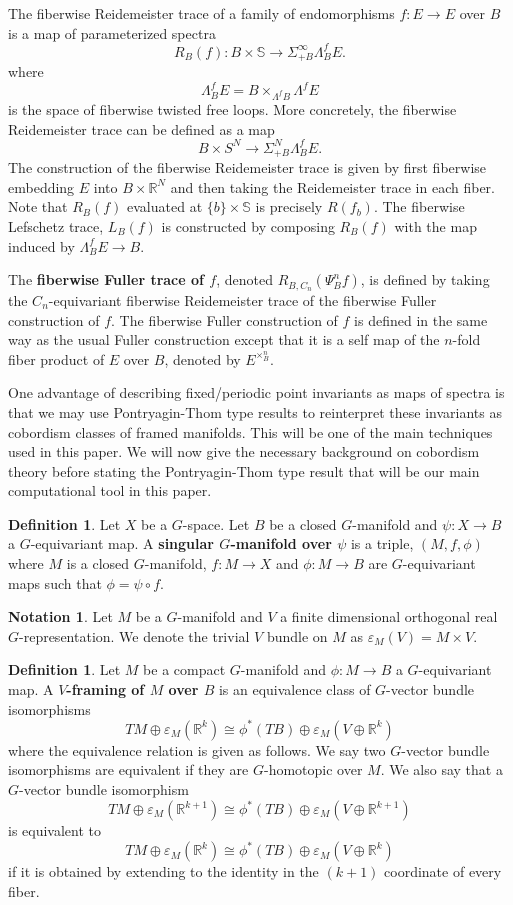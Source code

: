 \documentclass[11pt]{amsart}
\newcommand{\R}{\mathbb R}
\newcommand{\Sph}{\mathbb{S}}
\theoremstyle{plain}   %
\theoremstyle{definition}
\newtheorem{df}[thm]{Definition}
\newtheorem{notn}[thm]{Notation}
\theoremstyle{remark}
\numberwithin{equation}{section}
\begin{document}
The fiberwise Reidemeister trace of a family of endomorphisms $f\colon E\to E$ over $B$ is a map of parameterized spectra
\[
R_B(f)\colon B\times \Sph \rightarrow \Sigma_{+B}^\infty \Lambda_B^f E.
\]
where 
\[
\Lambda_B^f E = B\times_{\Lambda^f B}\Lambda^f E
\]
is the space of fiberwise twisted free loops. More concretely, the fiberwise Reidemeister trace can be defined as a map
\[
B\times S^N \to \Sigma_{+B}^N \Lambda_B^f E. 
\]
The construction of the fiberwise Reidemeister trace is given by first fiberwise embedding $E$ into $B\times \R^N$ and then taking the Reidemeister trace in each fiber. Note that $R_B(f)$ evaluated at $\{b\}\times \Sph$ is precisely $R(f_b)$. The fiberwise Lefschetz trace, $L_B(f)$ is constructed by composing $R_B(f)$ with the map induced by $\Lambda_B^f E \to B$. 


The \textbf{fiberwise Fuller trace of $f$}, denoted $R_{B,C_n}(\Psi_B^n f)$, is defined by taking the $C_n$-equivariant fiberwise Reidemeister trace of the fiberwise Fuller construction of $f$. The fiberwise Fuller construction of $f$ is defined in the same way as the usual Fuller construction except that it is a self map of the $n$-fold fiber product of $E$ over $B$, denoted by $E^{\times_B^n}$.

One advantage of describing fixed/periodic point invariants as maps of spectra is that we may use Pontryagin-Thom type results to reinterpret these invariants as cobordism classes of framed manifolds. This will be one of the main techniques used in this paper. We will now give the necessary background on cobordism theory before stating the Pontryagin-Thom type result that will be our main computational tool in this paper. 

\begin{df}
Let $X$ be a $G$-space. Let $B$ be a closed $G$-manifold and $\psi\colon X\to B$ a $G$-equivariant map.  A \textbf{singular $G$-manifold over $\psi$} is a triple, $(M,f,\phi)$ where $M$ is a closed $G$-manifold, $f\colon M\to X$ and $\phi\colon M\to B$ are $G$-equivariant maps such that $\phi=\psi\circ f$.
\end{df}

\begin{notn}
Let $M$ be a $G$-manifold and $V$ a finite dimensional orthogonal real $G$-representation. We denote the trivial $V$ bundle on $M$ as $\varepsilon_M(V)= M\times V$. 
\end{notn}

\begin{df}
Let $M$ be a compact $G$-manifold and $\phi\colon M\to B$ a $G$-equivariant map. A \textbf{$V$-framing of $M$ over $B$} is an equivalence class of $G$-vector bundle isomorphisms
\[
TM\oplus \varepsilon_M(\R^{k})\cong \phi^*(TB)\oplus \varepsilon_M(V\oplus\R^k)
\]
where the equivalence relation is given as follows. We say two $G$-vector bundle isomorphisms are equivalent if they are $G$-homotopic over $M$. We also say that a $G$-vector bundle isomorphism
\[
TM\oplus \varepsilon_M(\R^{k+1})\cong \phi^*(TB)\oplus \varepsilon_M(V\oplus\R^{k+1})
\]
is equivalent to 
\[
TM\oplus \varepsilon_M(\R^{k})\cong \phi^*(TB)\oplus \varepsilon_M(V\oplus\R^k)
\]
if it is obtained by extending to the identity in the $(k+1)$ coordinate of every fiber. 
\end{df}
\end{document}
